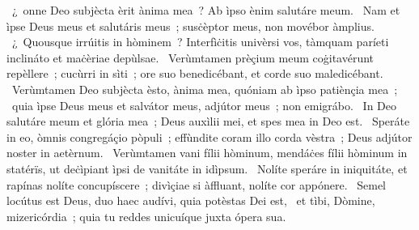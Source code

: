 \psalmChapterWithInscription{}
{ }
{%
~¿~onne Deo subjècta èrit ànima mea~? Ab ìpso ènim salutáre meum. 
~Nam et ìpse Deus meus et salutáris meus~; susċèptor meus, non movébor àmplius. 
~¿~Quousque irrúitis in hòminem~? Interfìċitis univèrsi vos, tàmquam paríeti inclináto et maċèriae depùlsae. 
~Verùmtamen prèçium meum coġitavérunt repèllere~; cucùrri in sìti~; ore suo benedicébant, et corde suo maledicébant. 
~Verùmtamen Deo subjècta èsto, ànima mea, quóniam ab ìpso patiènçia mea~; 
~quia ìpse Deus meus et salvátor meus, adjútor meus~; non emigrábo. 
~In Deo salutáre meum et glória mea~; Deus auxìlii mei, et spes mea in Deo est. 
~Speráte in eo, òmnis congregáçio pòpuli~; effùndite coram illo corda vèstra~; Deus adjútor noster in aetèrnum. 
~Verùmtamen vani fílii hòminum, mendáċes fílii hòminum in statérïs, ut deċìpiant ìpsi de vanitáte in idìpsum. 
~Nolíte speráre in iniquitáte, et rapínas nolíte concupíscere~; divìçiae si àffluant, nolíte cor appónere. 
~Semel locútus est Deus, duo haec audívi, quia potèstas Dei est, 
~et tìbi, Dòmine, mizericórdia~; quia tu reddes unicuíque juxta ópera sua. 
}
